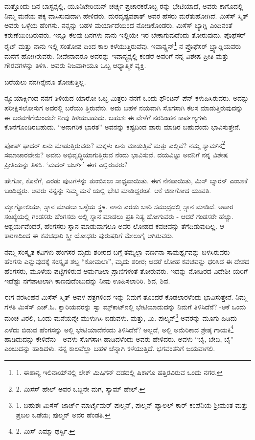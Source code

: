 ಮತ್ತೊಂದು ದಿನ ಬಾಸ್ಟನ್ನಲ್ಲಿ, ಯೂನಿಟೇರಿಯನ್ ಚರ್ಚ್ನ ಪ್ರಚಾರಕರೊಬ್ಬ ರನ್ನು ಭೇಟಿಯಾದೆ, ಅವರು ಕಾಗೊದಲ್ಲಿ ನಿಮ್ಮ ಮನೆಯ ಪಕ್ಕ ವಾಸಿಸುವುದಾಗಿ ಹೇಳಿದರು. ದುರದೃಷ್ಟವಶಾತ್ ಅವರ ಹೆಸರು ಮರೆತುಹೋಗಿದೆ. ಮಿಸೆಸ್ ಸ್ಮಿತ್ ಅವರು ಒಳ್ಳೆಯ ಹೆಂಗಸು. ನನ್ನನ್ನು ಬಹಳ ಮರ್ಯಾದೆಯಿಂದ ನೋಡಿಕೊಂಡರು. ಮಿಸೆಸ್ ಬ್ಯಾಗ್ಲಿ ಎಂದಿನಂತೆ ಕರುಣೆಯಿಂದಿರುವರು. ಇನ್ನೂ ಕೆಲವು ದಿನಗಳು ನಾನು ಇಲ್ಲಿಯೇ ಇರ ಬೇಕಾಗುವುದೆಂದು ತೋರುವುದು. ಪೊಫೆಸರ್ ರೈಟ್ ಮತ್ತು ನಾನು ಇಲ್ಲಿ ಸಂತೋಷ ದಿಂದ ಕಾಲ ಕಳೆಯುತ್ತಿರುವೆವು. ಇವಾನ್ಸ್ಟನ್\footnote{1. ಈಶಾನ್ಯ ಇಲಿನಾಯ್​ನಲ್ಲಿ ಲೇಕ್ ಮಿಷಿಗನ್ ದಡದಲ್ಲಿ ಷಿಕಾಗೊ ಹತ್ತಿರವಿರುವ ಒಂದು ನಗರ.} ನ ಪ್ರೊಫೆಸರ್ ಬ್ರ್ಯಾಡ್ಲಿಯವರು ಮನೆಗೆ ಹೋಗಿರುವರು. ನೀವೇನಾದರೂ ಅವರನ್ನು ಇವಾನ್ಸ್ಟನ್ನಲ್ಲಿ ಕಂಡರೆ ಅವರಿಗೆ ನನ್ನ ವಿಶೇಷ ಪ್ರೀತಿ ಮತ್ತು ಗೌರವಗಳನ್ನು ತಿಳಿಸಿ. ಅವರು ನಿಜವಾಗಿಯೂ ಒಬ್ಬ ಆಧ್ಯಾತ್ಮಿಕ ವ್ಯಕ್ತಿ.

ಬರೆಯಲು ನನಗಿನ್ನೇನೂ ತೋಚುತ್ತಿಲ್ಲ.

ನ್ಯೂಯಾರ್ಕ್ನಿಂದ ನನಗೆ ತಿಳಿಯದ ಯಾರೋ ಒಬ್ಬ ಮಿತ್ರರು ನನಗೆ ಒಂದು ಫೌಂಟನ್ ಪೆನ್ ಕಳುಹಿಸಿರುವರು. ಅದನ್ನು ಪರೀಕ್ಷಿಸಲೋಸುಗ ಅದರಲ್ಲಿ ಬರೆಯು ತ್ತಿರುವೆನು. ಅದು ಬಹಳ ನಯವಾಗಿ ಸೊಗಸಾಗಿ ಕೆಲಸ ಮಾಡುತ್ತಿರುವುದನ್ನು ಈ ಬರವಣಿಗೆಯಿಂದಲೇ ನೀವು ತಿಳಿಯಬಹುದು. ಬಹುಶಃ ಈ ವೇಳೆಗೆ ನರಸಿಂಹನ ಕಾರ್ಪಣ್ಯಗಳು ಕೊನೆಗೊಂಡಿರಬಹುದು. “ಅನಾಗರಿಕ ಭಾರತ” ಅವನನ್ನು ಕಷ್ಟದಿಂದ ಪಾರು ಮಾಡಿರ ಬಹುದೆಂದು ಭಾವಿಸುತ್ತೇನೆ.

ಪೋಪ್ ಫಾದರ್ ಏನು ಮಾಡುತ್ತಿರುವರು? ಮಕ್ಕಳು ಏನು ಮಾಡುತ್ತಿವೆ ಮತ್ತು ಎಲ್ಲಿವೆ? ನಮ್ಮ ಸ್ಯಾಮ್​ನ\footnote{2. ಮಿಸೆಸ್ ಹೇಲ್ ಅವರ ಒಬ್ಬನೇ ಮಗ, ಸ್ಯಾಮ್​ ಹೇಲ್.} ಸಮಾಚಾರವೇನು? ಅವನು ಅಭಿವೃದ್ಧಿಯಾಗುತ್ತಿರುವ ನೆಂದು ಭಾವಿಸುವೆ. ದಯವಿಟ್ಟು ಅವನಿಗೆ ನನ್ನ ವಿಶೇಷ ಪ್ರೀತಿಯನ್ನು ತಿಳಿಸಿ. ‘ಮದರ್ ಚರ್ಚ್’ ಈಗ ಎಲ್ಲಿರುವರು?

ಹೇಗೋ, ಕೊನೆಗೆ, ಎರಡು ಪುಟಗಳನ್ನು ತುಂಬಿಸಲು ಸಾಧ್ಯವಾಯಿತು. ಈಗ ನೆನಪಾಯಿತು, ಮಿಸ್ ಬ್ಯಾರನ್ ಎಂಬಾಕೆ ಬಂದಿದ್ದರು. ಅವರು ನನ್ನನ್ನು ನಿಮ್ಮ ಮನೆ ಯಲ್ಲಿ ಭೇಟಿ ಮಾಡಿದ್ದರಂತೆ. ಆಕೆ ಚಿಕಾಗೋದ ಯುವತಿ.

ಮ್ಯಾಗ್ನೋಲಿಯಾ, ಸ್ನಾನ ಮಾಡಲು ಒಳ್ಳೆಯ ಸ್ಥಳ. ನಾನು ಎರಡು ಬಾರಿ ಸಮುದ್ರದಲ್ಲಿ ಸ್ನಾನ ಮಾಡಿದೆ. ಅಪಾರ ಸಂಖ್ಯೆಯಲ್ಲಿ ಗಂಡಸರು ಹೆಂಗಸರು ಅಲ್ಲಿ ಸ್ನಾನ ಮಾಡಲು ಪ್ರತಿ ನಿತ್ಯ ಹೋಗುವರು - ಆದರೆ ಗಂಡಸರೇ ಹೆಚ್ಚು. ಆಶ್ಚರ್ಯವೆಂದರೆ, ಹೆಂಗಸರು ಸ್ನಾನ ಮಾಡುವಾಗಲೂ ಅವರ ಲೋಹದ ಕವಚವನ್ನು ತೆಗೆದಿಡುವುದಿಲ್ಲ. ಆ ಕಾರಣದಿಂದ ಈ ಕವಚಧಾರಿ ಸ್ತ್ರೀ ಯೋಧರು ಪುರುಷರಿಗೆ ಮೇಲುಗೈ ಆಗಿರುವರು.

ನಮ್ಮ ಸಂಸ್ಕೃತ ಕವಿಗಳು ಹೆಂಗಸರ ಮೃದು ಶರೀರದ ಬಗ್ಗೆ ತಮ್ಮೆಲ್ಲಾ ವರ್ಣನಾ ಸಾಮರ್ಥ್ಯವನ್ನು ಬಳಸಿರುವರು - ಹೆಂಗಸು ಎನ್ನುವುದಕ್ಕೆ ಸಂಸ್ಕೃತ ಶಬ್ದ “ಕೋಮಲಾ”, ಮೃದು ಶರೀರ; ಆದರೆ ಲೋಹ ಕವಚವನ್ನು ಧರಿಸಿದ ಈ ದೇಶದ ಹೆಂಗಸರು, ಮೂಳೆಯ ಪಟ್ಟಿಗಳಿರುವ ಆರ್ಮಡಿಲಾ ಪ್ರಾಣಿಗಳಂತೆ ತೋರುವರು. ಇದನ್ನು ನೋಡಿರದ ವಿದೇಶೀ ಯರಿಗೆ ಇದೆಷ್ಟು ನಗೆಪಾಟಲಾಗಿ ಕಾಣವುದೆಂಬುದನ್ನು ನೀವು ಊಹಿಸಲಾರಿರಿ. ಶಿವ, ಶಿವ.

ಈಗ ನರಸಿಂಹನ ಮಿಸೆಸ್ ಸ್ಮಿತ್ ಅವಳ ಪತ್ರಗಳಿಂದ ಇನ್ನು ನಿಮಗೆ ತೊಂದರೆ ಕೊಡಲಾರಳೆಂದು ಭಾವಿಸುತ್ತೇನೆ. ನಿಮ್ಮ ಗೆಳತಿ ಮಿಸೆಸ್ ಎಚ್.ಓ. ಕ್ವಾರಿಯವರನ್ನು ಸ್ವಾ ಮ್ಸ್​ಕಾಟ್​ನಲ್ಲಿ ಭೇಟಿಯಾದುದನ್ನು ನಿಮಗೆ ತಿಳಿಸಿದೆನೆ? -ಆಕೆ ಒಂದು ಮಂಚ ವಿರಲಿ, ಒಂದು ಮನೆಯನ್ನೇ ಮುಳುಗಿಸಿ ಬಿಡುವಳು. ಮತ್ತು, ಮಿ. ಪುಲ್ಮನ್\footnote{1. ಬಹುಶಃ ಮಿಸೆಸ್ ಜಾರ್ಜ್ ಮಾರ್ಟೈಮರ್ ಪುಲ್ಮನ್, ಪುಲ್ಮನ್ ಪ್ಯಾಲಲ್ ಕಾರ್ ಕಂಪೆನಿಯ ಶ‍್ರೀಮಂತ ಮತ್ತು ಪ್ರಬಲ ಒಡೆಯ; ಪುಲ್ಮನ್ ಅವರ ಹೆಂಡತಿ.} ಅವರನ್ನು ಮೂಗು ಹಿಡಿದು ಎಳೆದು ಬಿಡುವ ಹೆಂಗಸನ್ನು ಅಲ್ಲಿ ಭೇಟಿಯಾದೆನೆಂದು ತಿಳಿಸಿದೆನೆ? ಅಲ್ಲದೆ, ಅಲ್ಲಿ ಅಮೆರಿಕಾದ ಶ್ರೇಷ್ಠ ಗಾಯಕಿ\footnote{2. ಮಿಸ್ ಎಮ್ಮಾ ಥರ್ಸ್ಬಿ.} ಹಾಡಿದುದನ್ನು ಕೇಳಿದೆನು - ಅವಳು ಸೊಗಸಾಗಿ ಹಾಡಿದಳೆಂದು ಅವರು ಹೇಳಿದರು. ಅವಳು “ಬೈ, ಬೇಬಿ, ಬೈ” ಎಂಬುದನ್ನು ಹಾಡಿದಳು. ನನ್ನ ಕಾಲವೆಲ್ಲಾ ಬಹಳ ಚೆನ್ನಾಗಿ ಕಳೆಯುತ್ತಿದೆ. ಭಗವಂತನಿಗೆ ಜಯವಾಗಲಿ.


